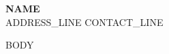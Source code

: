 \documentclass[letterpaper,11pt]{article}
\begin{document}
\begin{center}
    \textbf{\Huge \scshape {{NAME}} } \\ \vspace{1pt}
    {{ADDRESS_LINE}}
    \small {{CONTACT_LINE}}
\end{center}

{{BODY}}

\end{document}
